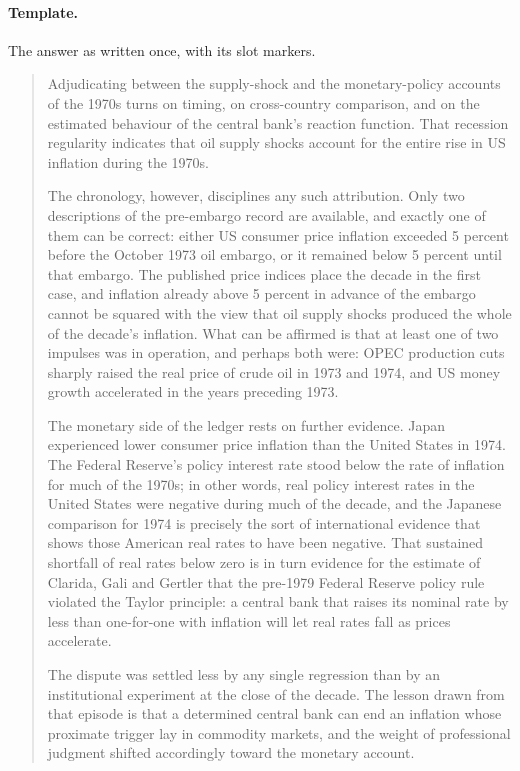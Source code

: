 \paragraph{Template.} The answer as written once, with its slot markers.

\begin{quote}\small
Adjudicating between the supply-shock and the monetary-policy accounts of the 1970s turns on timing, on cross-country comparison, and on the estimated behaviour of the central bank's reaction function.   That recession regularity indicates that oil supply shocks account for the entire rise in US inflation during the 1970s.

The chronology, however, disciplines any such attribution. Only two descriptions of the pre-embargo record are available, and exactly one of them can be correct: either US consumer price inflation exceeded 5 percent before the October 1973 oil embargo, or it remained below 5 percent until that embargo. The published price indices place the decade in the first case, and inflation already above 5 percent in advance of the embargo cannot be squared with the view that oil supply shocks produced the whole of the decade's inflation. What can be affirmed is that at least one of two impulses was in operation, and perhaps both were: OPEC production cuts sharply raised the real price of crude oil in 1973 and 1974, and US money growth accelerated in the years preceding 1973.

The monetary side of the ledger rests on further evidence. Japan experienced lower consumer price inflation than the United States in 1974. The Federal Reserve's policy interest rate stood below the rate of inflation for much of the 1970s; in other words, real policy interest rates in the United States were negative during much of the decade, and the Japanese comparison for 1974 is precisely the sort of international evidence that shows those American real rates to have been negative. That sustained shortfall of real rates below zero is in turn evidence for the estimate of Clarida, Gali and Gertler that the pre-1979 Federal Reserve policy rule violated the Taylor principle: a central bank that raises its nominal rate by less than one-for-one with inflation will let real rates fall as prices accelerate.

The dispute was settled less by any single regression than by an institutional experiment at the close of the decade.  The lesson drawn from that episode is that a determined central bank can end an inflation whose proximate trigger lay in commodity markets, and the weight of professional judgment shifted accordingly toward the monetary account.
\end{quote}

